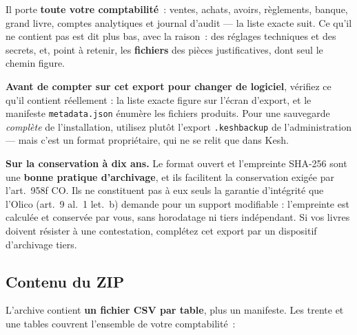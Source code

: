 \documentclass[a4paper,11pt,oneside]{article}
\begin{document}
\begin{keshwarning}[title={\faExclamationTriangle\ Ce que cet export couvre, et ce qu'il ne couvre pas}]
Il porte \textbf{toute votre comptabilité}~: ventes, achats, avoirs, règlements, banque,
grand livre, comptes analytiques et journal d'audit --- la liste exacte suit. Ce qu'il ne
contient pas est dit plus bas, avec la raison~: des réglages techniques et des secrets, et,
point à retenir, les \textbf{fichiers} des pièces justificatives, dont seul le chemin figure.

\medskip
\noindent \textbf{Avant de compter sur cet export pour changer de logiciel}, vérifiez ce qu'il
contient réellement : la liste exacte figure sur l'écran d'export, et le manifeste
\texttt{metadata.json} énumère les fichiers produits. Pour une sauvegarde \emph{complète} de
l'installation, utilisez plutôt l'export \texttt{.keshbackup} de l'administration --- mais
c'est un format propriétaire, qui ne se relit que dans Kesh.

\medskip
\noindent \textbf{Sur la conservation à dix ans.} Le format ouvert et l'empreinte SHA-256 sont
une \textbf{bonne pratique d'archivage}, et ils facilitent la conservation exigée par
l'art.~958f CO. Ils ne constituent pas à eux seuls la garantie d'intégrité que l'Olico
(art.~9 al.~1 let.~b) demande pour un support modifiable : l'empreinte est calculée et
conservée par vous, sans horodatage ni tiers indépendant. Si vos livres doivent résister à une
contestation, complétez cet export par un dispositif d'archivage tiers.
\end{keshwarning}

\subsection{Contenu du ZIP}

L'archive contient \textbf{un fichier CSV par table}, plus un manifeste. Les trente et une tables
couvrent l'ensemble de votre comptabilité~:
\end{document}
